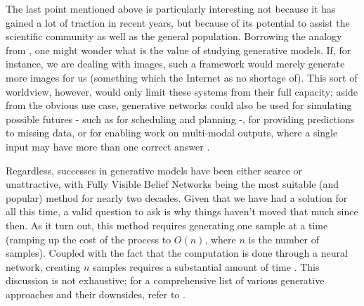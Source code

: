 \documentclass[a4paper]{book}
\begin{document}
The last point mentioned above is particularly interesting not because it has gained a lot of traction in recent years, but because of its potential to assist the scientific community as well as the general population. Borrowing the analogy from \textcite{goodfellow_nips_2016}, one might wonder what is the value of studying generative models. If, for instance, we are dealing with images, such a framework would merely generate more images for us (something which the Internet as no shortage of). This sort of worldview, however, would only limit these systems from their full capacity; aside from the obvious use case, generative networks could also be used for simulating possible futures - such as for scheduling and planning \parencite{finn_deep_2016} -, for providing predictions to missing data, or for enabling work on multi-modal outputs, where a single input may have more than one correct answer \parencite{goodfellow_nips_2016}.

Regardless, successes in generative models have been either scarce or unattractive, with Fully Visible Belief Networks \parencite{frey_does_1996} being the most suitable (and popular) method for nearly two decades. Given that we have had a solution for all this time, a valid question to ask is why things haven't moved that much since then. As it turn out, this method requires generating one sample at a time (ramping up the cost of the process to $O(n)$, where $n$ is the number of samples). Coupled with the fact that the computation is done through a neural network, creating $n$ samples requires a substantial amount of time \parencite{goodfellow_nips_2016}. This discussion is not exhaustive; for a comprehensive list of various generative approaches and their downsides, refer to \textcite{goodfellow_nips_2016}.
\end{document}
